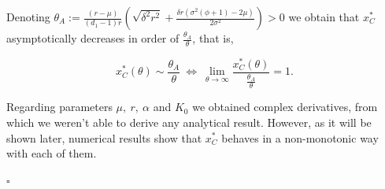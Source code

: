 

Denoting $\theta_A:=\frac{(r-\mu )}{(d_1-1) r}  \left(\sqrt{\delta ^2 r^2}+\frac{\delta  r \left(\sigma ^2 (\phi +1)-2 \mu \right)}{2 \sigma ^2}\right)>0$ we obtain that $x^*_C$ asymptotically decreases in order of $\frac{\theta_A}{\theta}$, that is,  

$$x^*_C(\theta) \sim \frac{\theta_A}{\theta} \ \Leftrightarrow \ \lim_{\theta \to \infty} \frac{x^*_C(\theta)}{\frac{\theta_A}{\theta}}=1.$$

Regarding parameters $\mu, \ r, \ \alpha$ and $K_0$ we obtained complex derivatives, from which we weren't able to derive any analytical result. However, as it will be shown later, numerical results show that $x_C^*$ behaves in a non-monotonic way with each of them.

\begin{flushright}
	$\square$
\end{flushright}









